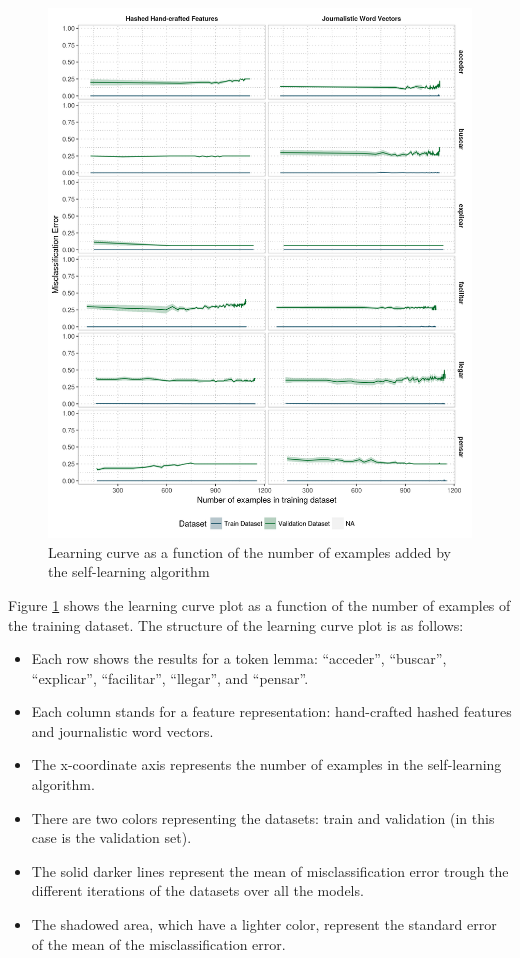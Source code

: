 \begin{figure}[htb!]
  \centering
  \includegraphics[height=.9\textheight,width=\textwidth,keepaspectratio]
    {plots/selflearning/overfit_measure_per_examples}
  \caption{Learning curve as a function of the number of examples added by the
  self-learning algorithm}
  \label{fig:self-learning:overfit}
\end{figure}

Figure \ref{fig:self-learning:overfit} shows the learning curve plot as a
function of the number of examples of the training dataset. The structure of
the learning curve plot is as follows:

\begin{itemize}
  \item Each row shows the results for a token lemma: ``acceder'', ``buscar'',
    ``explicar'', ``facilitar'', ``llegar'', and ``pensar''.
  \item Each column stands for a feature representation: hand-crafted hashed
    features and journalistic word vectors.
  \item The x-coordinate axis represents the number of examples in the
    self-learning algorithm.
  \item There are two colors representing the datasets: train and validation
    (in this case is the validation set).
  \item The solid darker lines represent the mean of misclassification error
    trough the different iterations of the datasets over all the models.
  \item The shadowed area, which have a lighter color, represent the standard
    error of the mean of the misclassification error.
\end{itemize}

